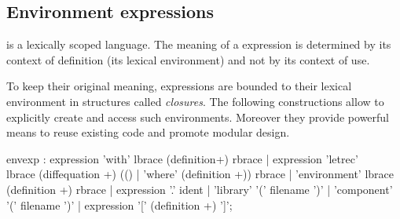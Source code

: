 \subsection{Environment expressions}
\faust is a lexically scoped language. The meaning of a \faust expression is determined by its context of definition (its lexical environment) and not by its context of use. 

To keep their original meaning, \faust expressions are bounded to their lexical environment in structures called \textit{closures}. The following constructions allow to explicitly create and access such environments. Moreover they provide powerful means to reuse existing code and promote modular design.


\begin{rail}
envexp :    expression 'with' lbrace (definition+) rbrace
          | expression 'letrec' \\ lbrace (diffequation +) (() | 'where' (definition +)) rbrace
          | 'environment' lbrace (definition +) rbrace
		  | expression '.' ident
          | 'library' '(' filename ')'
          | 'component' '(' filename ')'
          | expression '[' (definition +) ']';         
\end{rail}

